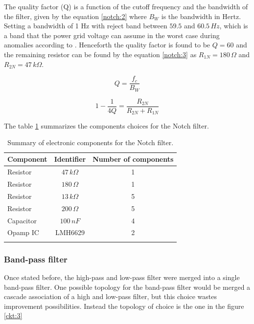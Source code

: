 The quality factor (Q) is a function of the cutoff frequency and the bandwidth of the filter, given by the equation \ref{notch:2} where $B_W$ is the bandwidth in Hertz. Setting a bandwidth of 1 Hz with reject band between $59.5$ and $60.5 \, Hz$, which is a band that the power grid voltage can assume in the worst case during anomalies according to \textcite{de2010modulo}. Henceforth the quality factor is found to be $Q=60$ and the remaining resistor can be found by the equation \ref{notch:3} as $R_{1N}=180 \, \Omega$ and $R_{2N}=47 \, k\Omega$.

\begin{center}
\begin{equation} \label{notch:2}
    Q = \frac{f_c}{B_W} 
\end{equation}
\end{center}

\begin{center}
\begin{equation} \label{notch:3}
    1 - \frac{1}{4Q} = \frac{R_{2N}}{R_{2N} + R_{1N}}
\end{equation}
\end{center}

The table \ref{tbl:3} summarizes the components choices for the Notch filter.

\begin{longtable}[H]{lcc}

\toprule
Component & Identifier & Number of components \\
\midrule
\endhead
Resistor & $47 \, k\Omega$ & 1\\
Resistor & $180 \, \Omega$ & 1\\
Resistor & $13 \, k\Omega$ & 5\\
Resistor & $200 \, \Omega$ & 5\\
Capacitor & $100 \, nF$ & 4\\
Opamp IC & LMH6629 & 2\\
\bottomrule
\caption{Summary of electronic components for the Notch filter.}
\label{tbl:3}
\end{longtable}

\subsubsection{Band-pass filter}

Once stated before, the high-pass and low-pass filter were merged into a single band-pass filter. One possible topology for the band-pass filter would be merged a cascade association of a high and low-pass filter, but this choice wastes improvement possibilities. Instead the topology of choice is the one in the figure \ref{ckt:3}

